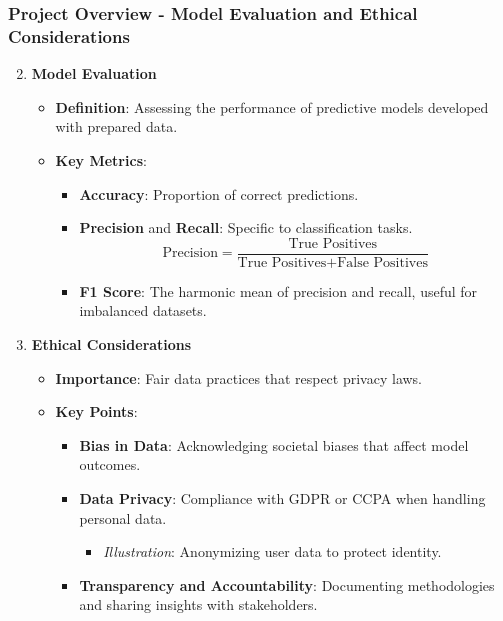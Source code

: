 \documentclass[aspectratio=169]{beamer}
\begin{document}
\begin{frame}[fragile]
    \frametitle{Project Overview - Model Evaluation and Ethical Considerations}
    \begin{enumerate}
        \setcounter{enumi}{1} %
        \item \textbf{Model Evaluation}
        \begin{itemize}
            \item \textbf{Definition}: Assessing the performance of predictive models developed with prepared data.
            \item \textbf{Key Metrics}:
                \begin{itemize}
                    \item \textbf{Accuracy}: Proportion of correct predictions.
                    \item \textbf{Precision} and \textbf{Recall}: Specific to classification tasks.
                    \begin{equation}
                        \text{Precision} = \frac{\text{True Positives}}{\text{True Positives} + \text{False Positives}}
                    \end{equation}
                    \item \textbf{F1 Score}: The harmonic mean of precision and recall, useful for imbalanced datasets.
                \end{itemize}
        \end{itemize}

        \item \textbf{Ethical Considerations}
        \begin{itemize}
            \item \textbf{Importance}: Fair data practices that respect privacy laws.
            \item \textbf{Key Points}:
                \begin{itemize}
                    \item \textbf{Bias in Data}: Acknowledging societal biases that affect model outcomes.
                    \item \textbf{Data Privacy}: Compliance with GDPR or CCPA when handling personal data.
                    \begin{itemize}
                        \item \textit{Illustration}: Anonymizing user data to protect identity.
                    \end{itemize}
                    \item \textbf{Transparency and Accountability}: Documenting methodologies and sharing insights with stakeholders.
                \end{itemize}
        \end{itemize}
    \end{enumerate}
\end{frame}
\end{document}
